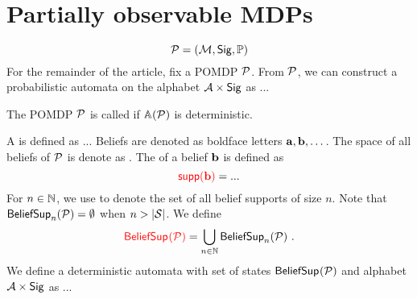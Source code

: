 %
%
%
\section{Partially observable MDPs}
%
\[
\pdp = (\mdp,\sig,\obpr)
\]
%
For the remainder of the article, fix a POMDP $\pdp$. 
From $\pdp$, we can construct a probabilistic automata \emphdef{$\aut{\pdp}$} on the alphabet $\ac \times \sig$ as ...
%
\begin{definition}
The POMDP $\pdp$ is called  if $\aut{\pdp}$ is deterministic.
\end{definition}
%
A  is defined as ...
Beliefs are denoted as boldface letters $\bel{a},\bel{b},\dots$.
The space of all beliefs of $\pdp$ is denote as \emphdef{$\bsp{\pdp}$}.
The  of a belief $\bel{b}$ is defined as
\[
\emphdef{$\supp{\bel{b}}$} = ...
\]
For $n\in\N$, we use \emphdef{$\bsup[n]{\pdp}$} to denote the set of all belief supports of size $n$.
Note that $\bsup[n]{\pdp} = \emptyset$ when $n > |\st|$.
We define
\[
\emphdef{$\bsup{\pdp}$} = \bigcup_{n\in\N} \bsup[n]{\pdp} \ .
\]
We define a deterministic automata \emphdef{$\baut{\pdp}$} with set of states $\bsup{\pdp}$ and alphabet $\ac\times\sig$ as ...
%